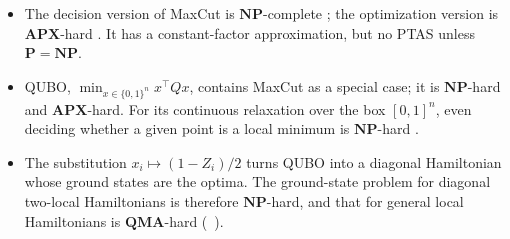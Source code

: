 \documentclass[handoutsbeamer.tex]{subfiles}
\begin{document}
\begin{frame}
\begin{itemize}\setlength\itemsep{0.3em}
    \item The decision version of MaxCut is $\mathbf{NP}$-complete \citep{Garey1976}; the optimization version is $\mathbf{APX}$-hard \citep{lee2021classifying}. It has a constant-factor approximation, but no PTAS unless $\mathbf P = \mathbf{NP}$.
    \item QUBO, $\min_{x\in\{0,1\}^n}x^\top Qx$, contains MaxCut as a special case; it is $\mathbf{NP}$-hard and $\mathbf{APX}$-hard. For its continuous relaxation over the box $[0,1]^n$, even deciding whether a given point is a local minimum is $\mathbf{NP}$-hard \citep{murty1987some}.
    \item The substitution $x_i \mapsto (1-Z_i)/2$ turns QUBO into a diagonal Hamiltonian whose ground states are the optima. The ground-state problem for diagonal two-local Hamiltonians is therefore $\mathbf{NP}$-hard, and that for general local Hamiltonians is $\mathbf{QMA}$-hard (\Chap~).
\end{itemize}
\end{frame}
\end{document}
